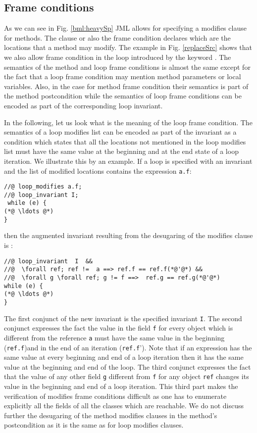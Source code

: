 \subsection{Frame conditions}\label{javaVerif:JML:frame}

As we can see in Fig. \ref {bml:heavySp} JML allows for specifying a modifies clause for methods. 
The \modifies{} clause or also the frame condition declares which are the locations that a method may modify.
The example in Fig. \ref{replaceSrc} shows that we also allow frame condition in the loop introduced by the keyword \loopMod.
The semantics of the method and loop frame conditions is almost the same except for the fact that a loop frame condition  may mention 
method parameters or local variables.  Also, in the case for method frame condition their semantics is part of the method postcondition 
while the semantics of  loop frame conditions can be encoded as part of the corresponding loop invariant.

In the following, let us look what is the meaning of the loop frame condition.
The semantics of a loop modifies list can be encoded as part of the invariant as a condition which states
that all the locations not mentioned in the  loop modifies list must have the same value at the beginning and at the end state of a loop iteration.
We illustrate this by an example. If a loop is specified with an invariant \invariant{} and the list of modified locations contains the expression \lstinline!a.f!:
\begin{lstlisting}[frame=trbl]
//@ loop_modifies a.f;
//@ loop_invariant I;
 while (e) {
(*@ \ldots @*)
} 
\end{lstlisting}
 then the augmented invariant resulting from the desugaring of the modifies clause is  : 
\begin{lstlisting}[frame=trbl]
//@ loop_invariant  I  &&
//@  \forall ref; ref !=  a ==> ref.f == ref.f(*@'@*) && 
//@  \forall g \forall ref; g != f ==>  ref.g == ref.g(*@'@*)
while (e) {
(*@ \ldots @*)
} 
\end{lstlisting}
The first conjunct of the new invariant is the specified invariant \lstinline!I!. The second conjunct expresses the fact the value in the field  \lstinline!f!
for every object which is different from the reference  \lstinline!a!  must have the same value in the beginning (\lstinline!ref.f!)and in the end of an iteration (\lstinline!ref.f!').
 Note that if an expression has the same value at every  beginning and end of a loop iteration then it has the same value at the beginning and end of the loop.   
The third conjunct expresses the fact that the value of any other field  \lstinline!g! different from  \lstinline!f! for any object 
 \lstinline!ref! changes its value in the beginning and end of a loop iteration.
This third part makes the verification of modifies frame conditions difficult as one has to enumerate explicitly all the fields of all the classes which are reachable.
We do not discuss further the desugaring of the method modifies clauses in the method's postcondition as it is the same as for loop modifies clauses. 

